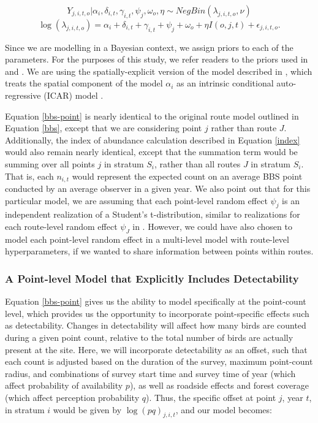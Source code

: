 \documentclass[12pt]{article}
\begin{document}
\begin{equation*}
	Y_{j,i,t,o} | \alpha_i, \delta_{i,t}, \gamma_{i,t}, \psi_j, \omega_o, \eta \sim NegBin(\lambda_{j,i,t,o}, \nu)
\end{equation*}
\begin{equation}\label{bbs-point}
	\log(\lambda_{j,i,t,o}) = \alpha_i + \delta_{i,t} + \gamma_{i,t} + \psi_j + \omega_o + \eta I(o,j,t) + \epsilon_{j,i,t,o}.
\end{equation}

Since we are modelling in a Bayesian context, we assign priors to each of the parameters. 
For the purposes of this study, we refer readers to the priors used in \citet{smith_north_2021} and \citet{smith_spatially_2023}.
We are using the spatially-explicit version of the model described in \citet{smith_spatially_2023}, which treats the spatial component of the model $\alpha_i$ as an intrinsic conditional auto-regressive (ICAR) model \citep{besag_bayesian_1991}.

\par Equation \ref{bbs-point} is nearly identical to the original route model outlined in Equation \ref{bbs}, except that we are considering point $j$ rather than route $J$.
Additionally, the index of abundance calculation described in Equation \ref{index} would also remain nearly identical, except that the summation term would be summing over all points $j$ in stratum $S_i$, rather than all routes $J$ in stratum $S_i$. 
That is, each $n_{i,t}$ would represent the expected count on an average BBS point conducted by an average observer in a given year.
We also point out that for this particular model, we are assuming that each point-level random effect $\psi_j$ is an independent realization of a Student's t-distribution, similar to realizations for each route-level random effect $\psi_J$ in \citet{smith_north_2021, smith_spatially_2023}.
However, we could have also chosen to model each point-level random effect in a multi-level model with route-level hyperparameters, if we wanted to share information between points within routes.

\subsubsection{A Point-level Model that Explicitly Includes Detectability}

\par Equation \ref{bbs-point} gives us the ability to model specifically at the point-count level, which provides us the opportunity to incorporate point-specific effects such as detectability.
Changes in detectability will affect how many birds are counted during a given point count, relative to the total number of birds are actually present at the site. 
Here, we will incorporate detectability as an offset, such that each count is adjusted based on the duration of the survey, maximum point-count radius, and combinations of survey start time and survey time of year (which affect probability of availability $p$), as well as roadside effects and forest coverage (which affect perception probability $q$). 
Thus, the specific offset at point $j$, year $t$, in stratum $i$ would be given by $\log(p q)_{j,i,t}$, and our model becomes:
\end{document}
